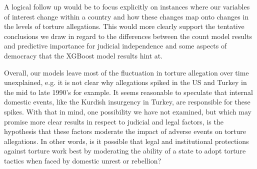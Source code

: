 \documentclass[12pt]{article}
\begin{document}
A logical follow up would be to focus explicitly on instances where our variables of interest change within a country and how these changes map onto changes in the levels of torture allegations. This would more clearly support the tentative conclusions we draw in regard to the differences between the count model results and predictive importance for judicial independence and some aspects of democracy that the XGBoost model results hint at. 

Overall, our models leave most of the fluctuation in torture allegation over time unexplained, e.g. it is not clear why allegations spiked in the US and Turkey in the mid to late 1990's for example. It seems reasonable to speculate that internal domestic events, like the Kurdish insurgency in Turkey, are responsible for these spikes. With that in mind, one possibility we have not examined, but which may promise more clear results in respect to judicial and legal factors, is the hypothesis that these factors moderate the impact of adverse events on torture allegations. In other words, is it possible that legal and institutional protections against torture work best by moderating the ability of a state to adopt torture tactics when faced by domestic unrest or rebellion? 

\clearpage
\begin{singlespace}


\end{singlespace}
\end{document}

